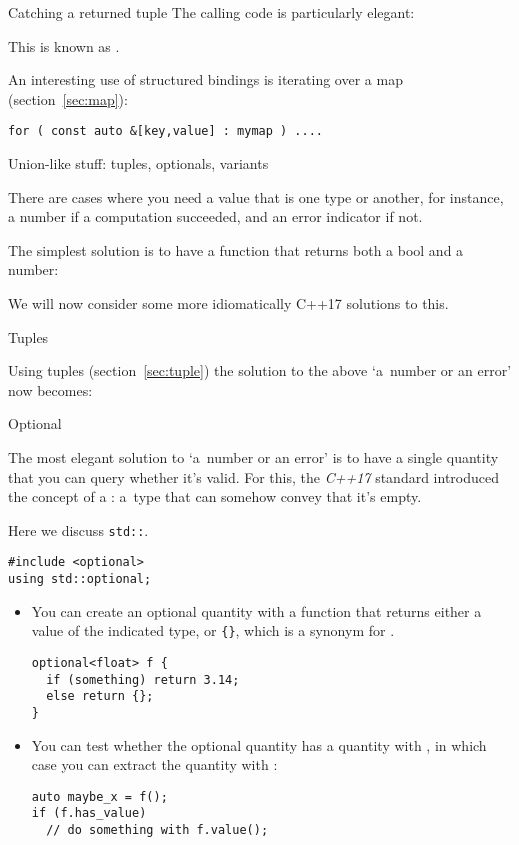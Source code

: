 \begin{block}{Catching a returned tuple}
  \label{sl:catch-tuple}
  The calling code is particularly elegant:

  This is known as .
\end{block}

An interesting use of structured bindings is iterating over a map (section~\ref{sec:map}):
\begin{lstlisting}
for ( const auto &[key,value] : mymap ) ....
\end{lstlisting}

 {Union-like stuff: tuples, optionals, variants}

There are cases where you need a value that is one type or another,
for instance, a number if a computation succeeded, and an error
indicator if not.

The simplest solution is to have a function that returns both a bool
and a number:
%

We will now consider some more idiomatically C++17 solutions to this.

 {Tuples}

Using tuples (section~\ref{sec:tuple}) 
the solution to the above `a~number or an error' now becomes:
%

 {Optional}
\label{sec:std-optional}

The most elegant solution to `a~number or an error' is to have a
single quantity that you can query whether it's valid.
For this, the
\emph{C++17} standard
introduced the concept of a :
a~type that can somehow convey that it's empty.

Here we discuss \lstinline{std::}.

\begin{lstlisting}
#include <optional>
using std::optional;
\end{lstlisting}

\begin{itemize}
\item You can create an optional quantity with a function that returns
  either a value of the indicated type, or \verb+{}+, which is a
  synonym for .
\begin{lstlisting}
optional<float> f {
  if (something) return 3.14;
  else return {};
}
\end{lstlisting}
\item You can test whether the optional quantity has a quantity with
  , in which case you can extract the quantity
  with :
\begin{lstlisting}
auto maybe_x = f();
if (f.has_value)
  // do something with f.value();
\end{lstlisting}
\end{itemize}

